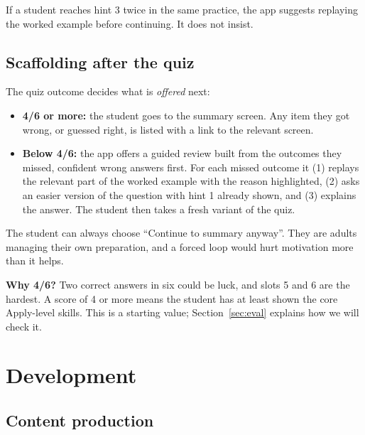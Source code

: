 \documentclass[11pt,a4paper]{article}
\begin{document}
If a student reaches hint 3 twice in the same practice, the app suggests replaying the worked
example before continuing. It does not insist.

\subsection{Scaffolding after the quiz}

The quiz outcome decides what is \emph{offered} next:

\begin{itemize}
  \item \textbf{4/6 or more:} the student goes to the summary screen. Any item they got wrong, or
        guessed right, is listed with a link to the relevant screen.
  \item \textbf{Below 4/6:} the app offers a guided review built from the outcomes they missed,
        confident wrong answers first. For each missed outcome it (1) replays the relevant part of
        the worked example with the reason highlighted, (2) asks an easier version of the question
        with hint 1 already shown, and (3) explains the answer. The student then takes a fresh
        variant of the quiz.
\end{itemize}

The student can always choose ``Continue to summary anyway''. They are adults managing their own
preparation, and a forced loop would hurt motivation more than it helps.

\textbf{Why 4/6?} Two correct answers in six could be luck, and slots 5 and 6 are the hardest. A
score of 4 or more means the student has at least shown the core Apply-level skills. This is a
starting value; Section~\ref{sec:eval} explains how we will check it.

\section{Development}
\label{sec:dev}

\subsection{Content production}
\end{document}
